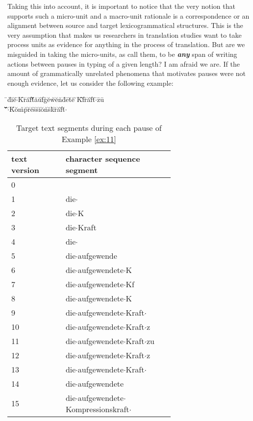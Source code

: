Taking this into account, it is important to notice that the very notion that supports such a micro-unit and a macro-unit rationale is a correspondence or an alignment between source and target lexicogrammatical structures. This is the very assumption that makes us researchers in translation studies want to take process units as evidence for anything in the process of translation. But are we misguided in taking the micro-units, as \citet{Alves:2009js,Alves:2011vj} call them, to be \textbf{\textit{any}} span of writing actions between pauses in typing of a given length? I am afraid we are. If the amount of grammatically unrelated phenomena that motivates pauses were not enough evidence, let us consider the following example:

\begin{exe}
  \ex\label{ex:11}\={ }d\u{ }i\u{ }e\u{ }$\cdot$\={ }K\={ }r\u{ }a\u{ }f\u{ }t\={ }\uettl\u{ }\uettl\u{ }\uettl\u{ }\uettl\u{ }\uettl\={ }a\u{ }u\u{ }f\u{ }g\u{ }e\u{ }w\u{ }e\u{ }n\u{ }d\u{ }e\={ }t\u{ }e\u{ } \u{ }K\={ }f\={ }\uettl\u{ }r\u{ }a\u{ }f\u{ }t\u{ }$\cdot$\={ }z\={ }u\={ }\\ 
\uettl\={ }\uettl\={ }\uettl\u{ }\uettl\u{ }\uettl\u{ }\uettl\u{ }\uettl\u{ }\uettl\u{ }\uettl\={ }$\cdot$\u{ }K\u{ }o\u{ }m\u{ }p\u{ }r\u{ }e\u{ }s\u{ }s\u{ }i\u{ }o\u{ }n\u{ }s\u{ }k\u{ }r\u{ }a\u{ }f\u{ }t\u{ }$\cdot$
\end{exe}

\begin{table}[h!]
\centering
\begin{tabular}{ | p{0.22\linewidth} | p{0.44\linewidth} | }
\hline
text version & character sequence segment \\
\hline
0 & \\
1 & die$\cdot$ \\
2 & die$\cdot$K \\
3 & die$\cdot$Kraft \\
4 & die$\cdot$ \\
5 & die$\cdot$aufgewende \\
6 & die$\cdot$aufgewendete$\cdot$K \\
7 & die$\cdot$aufgewendete$\cdot$Kf \\
8 & die$\cdot$aufgewendete$\cdot$K \\
9 & die$\cdot$aufgewendete$\cdot$Kraft$\cdot$ \\
10 & die$\cdot$aufgewendete$\cdot$Kraft$\cdot$z \\
11 & die$\cdot$aufgewendete$\cdot$Kraft$\cdot$zu \\
12 & die$\cdot$aufgewendete$\cdot$Kraft$\cdot$z \\
13 & die$\cdot$aufgewendete$\cdot$Kraft$\cdot$ \\
14 & die$\cdot$aufgewendete \\
15 & die$\cdot$aufgewendete$\cdot$Kompressionskraft$\cdot$ \\
\hline
\end{tabular}
\caption{ Target text segments during each pause of Example \ref{ex:11} }
\label{tab:ActionsEx11}
\end{table}

